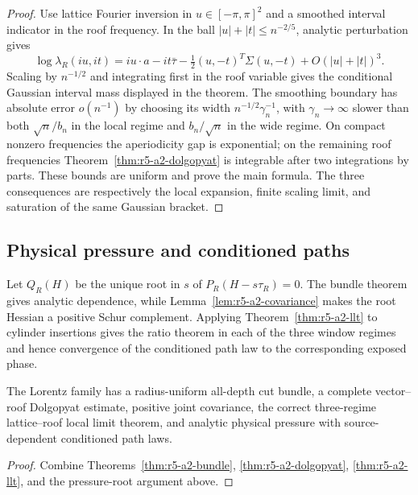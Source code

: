 \begin{proof}
Use lattice Fourier inversion in \(u\in[-\pi,\pi]^2\) and a smoothed interval
indicator in the roof frequency.  In the ball
\(|u|+|t|\le n^{-2/5}\), analytic perturbation gives
\[
 \log\lambda_R(iu,it)
 =i u\cdot a-it\bar\tau
 -\tfrac12(u,-t)^T\Sigma(u,-t)+O(|u|+|t|)^3.
\]
Scaling by \(n^{-1/2}\) and integrating first in the roof variable gives the
conditional Gaussian interval mass displayed in the theorem.  The smoothing
boundary has absolute error
\(o(n^{-1})\) by choosing its width
\(n^{-1/2}\gamma_n^{-1}\), with
\(\gamma_n\to\infty\) slower than both
\(\sqrt n/b_n\) in the local regime and \(b_n/\sqrt n\) in the wide regime.
On compact nonzero frequencies the aperiodicity gap is exponential; on the
remaining roof frequencies Theorem~\ref{thm:r5-a2-dolgopyat} is integrable
after two integrations by parts.  These bounds are uniform and prove the main
formula.  The three consequences are respectively the local expansion,
finite scaling limit, and saturation of the same Gaussian bracket.
\end{proof}

\subsection{Physical pressure and conditioned paths}

Let \(Q_R(H)\) be the unique root in \(s\) of
\(P_R(H-s\tau_R)=0\).  The bundle theorem gives analytic dependence, while
Lemma~\ref{lem:r5-a2-covariance} makes the root Hessian a positive Schur
complement.  Applying Theorem~\ref{thm:r5-a2-llt} to cylinder insertions gives
the ratio theorem in each of the three window regimes and hence convergence
of the conditioned path law to the corresponding exposed phase.

\begin{theorem}
\label{thm:r5-a2-main}
The Lorentz family has a radius-uniform all-depth cut bundle, a complete
vector--roof Dolgopyat estimate, positive joint covariance, the correct
three-regime lattice--roof local limit theorem, and analytic physical pressure
with source-dependent conditioned path laws.
\end{theorem}

\begin{proof}
Combine Theorems~\ref{thm:r5-a2-bundle},
\ref{thm:r5-a2-dolgopyat}, \ref{thm:r5-a2-llt}, and the pressure-root argument
above.
\end{proof}
